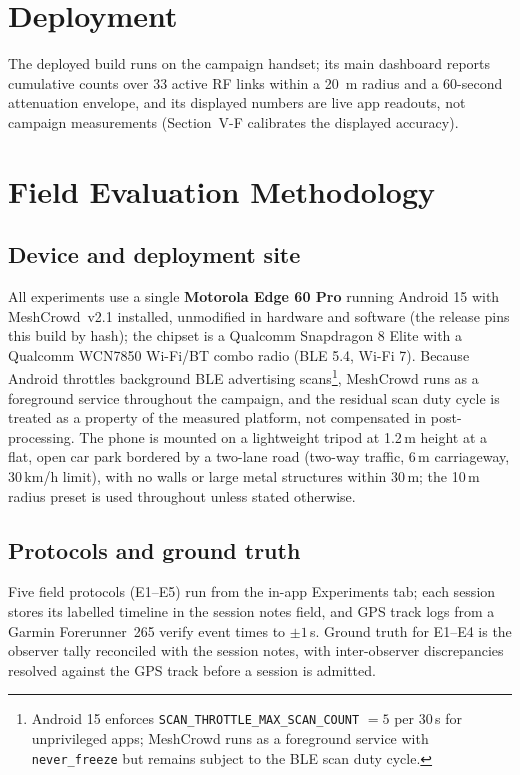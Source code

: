 \documentclass[journal,10pt]{IEEEtran}
\begin{document}
\section{Deployment}
The deployed build runs on the campaign handset; its main dashboard reports
cumulative counts over 33 active RF links within a 20~m radius and a 60-second
attenuation envelope, and its displayed numbers are live app readouts, not
campaign measurements (Section~V-F calibrates the displayed accuracy).

\section{Field Evaluation Methodology}
\label{sec:method}

\subsection{Device and deployment site}
All experiments use a single \textbf{Motorola Edge 60 Pro} running Android 15
with MeshCrowd~v2.1 installed, unmodified in hardware and software (the
release pins this build by hash); the chipset is a Qualcomm Snapdragon 8 Elite
with a Qualcomm WCN7850 Wi-Fi/BT combo radio (BLE 5.4, Wi-Fi 7). Because
Android throttles background BLE advertising scans\footnote{Android 15
enforces \texttt{SCAN\_THROTTLE\_MAX\_SCAN\_COUNT} $=5$ per 30\,s for
unprivileged apps; MeshCrowd runs as a foreground service with
\texttt{never\_freeze} but remains subject to the BLE scan duty cycle.},
MeshCrowd runs as a foreground service throughout the campaign, and the
residual scan duty cycle is treated as a property of the measured platform,
not compensated in post-processing. The phone is mounted on a lightweight
tripod at 1.2\,m height at a flat, open car park bordered by a two-lane road
(two-way traffic, 6\,m carriageway, 30\,km/h limit), with no walls or large
metal structures within 30\,m; the 10\,m radius preset is used throughout
unless stated otherwise.

\subsection{Protocols and ground truth}
Five field protocols (E1--E5) run from the in-app Experiments tab; each
session stores its labelled timeline in the session notes field, and GPS track
logs from a Garmin Forerunner~265 verify event times to $\pm1$\,s. Ground
truth for E1--E4 is the observer tally reconciled with the session notes, with
inter-observer discrepancies resolved against the GPS track before a session
is admitted.
\end{document}
